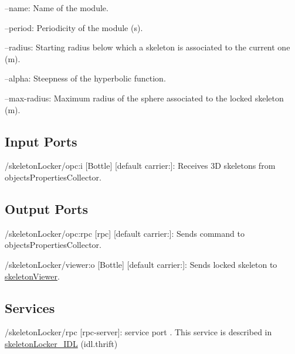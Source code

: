 \begin{DoxyItemize}
\item --name\+: Name of the module.
\item --period\+: Periodicity of the module (s).
\item --radius\+: Starting radius below which a skeleton is associated to the current one (m).
\item --alpha\+: Steepness of the hyperbolic function.
\item --max-\/radius\+: Maximum radius of the sphere associated to the locked skeleton (m). 
\end{DoxyItemize}\hypertarget{group__skeletonViewer_inputports_sec}{}\subsection{Input Ports}\label{group__skeletonViewer_inputports_sec}

\begin{DoxyItemize}
\item /skeleton\+Locker/opc\+:i \mbox{[}Bottle\mbox{]} \mbox{[}default carrier\+:\mbox{]}\+: Receives 3D skeletons from objects\+Properties\+Collector.
\end{DoxyItemize}\hypertarget{group__skeletonViewer_outputports_sec}{}\subsection{Output Ports}\label{group__skeletonViewer_outputports_sec}

\begin{DoxyItemize}
\item /skeleton\+Locker/opc\+:rpc \mbox{[}rpc\mbox{]} \mbox{[}default carrier\+:\mbox{]}\+: Sends command to objects\+Properties\+Collector.
\item /skeleton\+Locker/viewer\+:o \mbox{[}Bottle\mbox{]} \mbox{[}default carrier\+:\mbox{]}\+: Sends locked skeleton to \hyperlink{group__skeletonViewer}{skeleton\+Viewer}.
\end{DoxyItemize}\hypertarget{group__skeletonViewer_services_sec}{}\subsection{Services}\label{group__skeletonViewer_services_sec}

\begin{DoxyItemize}
\item /skeleton\+Locker/rpc \mbox{[}rpc-\/server\mbox{]}\+: service port . This service is described in \hyperlink{classskeletonLocker__IDL}{skeleton\+Locker\+\_\+\+I\+DL} (idl.\+thrift) 
\end{DoxyItemize}